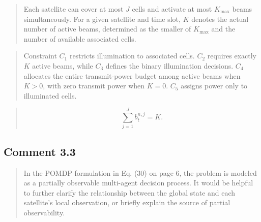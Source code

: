 \documentclass[11pt,a4paper]{article}
\begin{document}

\begin{quote}\small\color{revisionblue}
Each satellite can cover at most $J$ cells and activate at most $K_{\max}$ beams simultaneously. For a given satellite and time slot, $K$ denotes the actual number of active beams, determined as the smaller of $K_{\max}$ and the number of available associated cells.
\par
\end{quote}


\begin{quote}\small\color{revisionblue}
Constraint $C_1$ restricts illumination to associated cells. $C_2$ requires exactly $K$ active beams, while $C_3$ defines the binary illumination decisions. $C_4$ allocates the entire transmit-power budget among active beams when $K>0$, with zero transmit power when $K=0$. $C_5$ assigns power only to illuminated cells.
\par
\end{quote}


\begin{quote}\small\color{revisionblue}
\begin{equation*}
\sum_{j=1}^{J} b_t^{n,j}=K.
\tag{43}\end{equation*}
\end{quote}


\subsection*{Comment 3.3}

\begin{quote}\small In the POMDP formulation in Eq. (30) on page 6, the problem is modeled as a partially observable multi-agent decision process. It would be helpful to further clarify the relationship between the global state and each satellite’s local observation, or briefly explain the source of partial observability.\end{quote}
\end{document}
